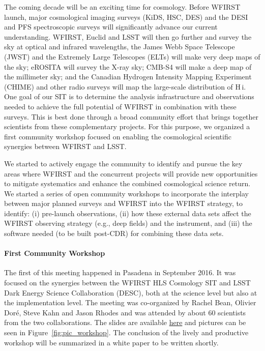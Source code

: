 %
%

\begin{summary}
The coming decade will be an exciting time for cosmology. Before WFIRST launch,
major cosmological imaging surveys (KiDS, HSC, DES) and the DESI and PFS
spectroscopic surveys will significantly advance our current understanding.
WFIRST, Euclid and LSST  will then go further and survey the sky at optical and
infrared wavelengths, the  James Webb Space Telescope (JWST) and the Extremely
Large Telescopes (ELTs) will make very deep maps of the sky; eROSITA will survey
the X-ray sky; CMB-S4 will make a deep map of the millimeter sky; and the
Canadian Hydrogen Intensity Mapping Experiment (CHIME) and other radio surveys
will map the large-scale distribution of H$\,${\sc i}. One goal of our SIT is to
determine the analysis infrastructure and observations needed to achieve the
full potential of WFIRST in combination with these  surveys. This is best done
through a broad community effort that brings together scientists from these
complementary projects. For this purpose, we organized a first community
workshop focused on enabling the cosmological scientific synergies between
WFIRST and LSST.
\end{summary}



We started to actively engage the community to identify and pursue the key areas
where WFIRST and the concurrent projects will provide new opportunities to
mitigate systematics and enhance the combined cosmological science return. We
started a series of open community workshops to incorporate the interplay
between major planned surveys and WFIRST into the WFIRST strategy, to identify:
(i) pre-launch observations, (ii) how these external data sets affect the WFIRST
observing strategy (e.g., deep fields) and the instrument, and (iii) the
software needed (to be built post-CDR) for combining these data sets.

\paragraph*{First Community Workshop} The first of this meeting happened in
Pasadena in September 2016. It was focused on the synergies between the WFIRST
HLS Cosmology SIT and LSST Dark Energy Science Collaboration (DESC), both at the
science level but also at the implementation level. The meeting was co-organized
by Rachel Bean, Olivier Dor\'e, Steve Kahn and Jason Rhodes and was attended by
about 60 scientists from the two collaborations. The slides are available
\href{https://conference.ipac.caltech.edu/wfirst_lsst/}{here} and pictures can
be seen in Figure~\ref{fig:pic_workshop}. The conclusion of the lively and
productive workshop will be summarized in a white paper to be written shortly.

